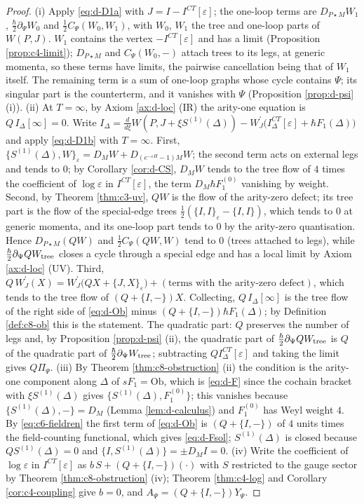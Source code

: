 \begin{proof}
(i) Apply \eqref{eq:d-D1a} with $J=I-I^{CT}[\varepsilon]$; the one-loop terms are $D_{P\star M}W_1$, $\tfrac\hbar2\partial_\Psi W_0$ and $\tfrac12C_\Psi(W_0,W_1)$, with $W_0$, $W_1$ the tree and one-loop parts of $W(P,J)$. $W_1$ contains the vertex $-I^{CT}[\varepsilon]$ and has a limit (Proposition \ref{prop:c4-limit}); $D_{P\star M}$ and $C_\Psi(W_0,-)$ attach trees to its legs, at generic momenta, so these terms have limits, the pairwise cancellation being that of $W_1$ itself. The remaining term is a sum of one-loop graphs whose cycle contains $\Psi$; its singular part is the counterterm, and it vanishes with $\Psi$ (Proposition \ref{prop:d-psi} (i)). (ii) At $T=\infty$, by Axiom \ref{ax:d-loc} (IR) the arity-one equation is $Q\,I_\Delta[\infty]=0$. Write $I_\Delta=\frac{d}{d\xi}W(P,J+\xi S^{(1)}(\Delta))-W^{\prime}_J\big(I^{CT}_\Delta[\varepsilon]+\hbar F_1(\Delta)\big)$ and apply \eqref{eq:d-D1b} with $T=\infty$. First, $\{S^{(1)}(\Delta),W\}_\varepsilon=D_MW+D_{(e^{-\varepsilon H}-1)M}W$; the second term acts on external legs and tends to $0$; by Corollary \ref{cor:d-CS}, $D_MW$ tends to the tree flow of $4$ times the coefficient of $\log\varepsilon$ in $I^{CT}[\varepsilon]$, the term $D_M\hbar F_1^{(0)}$ vanishing by weight. Second, by Theorem \ref{thm:c3-uv}, $QW$ is the flow of the arity-zero defect; its tree part is the flow of the special-edge trees $\tfrac12(\{I,I\}_\varepsilon-\{I,I\})$, which tends to $0$ at generic momenta, and its one-loop part tends to $0$ by the arity-zero quantisation. Hence $D_{P\star M}(QW)$ and $\tfrac12C_\Psi(QW,W)$ tend to $0$ (trees attached to legs), while $\tfrac\hbar2\partial_\Psi QW_{\rm tree}$ closes a cycle through a special edge and has a local limit by Axiom \ref{ax:d-loc} (UV). Third, $Q\,W^{\prime}_J(X)=W^{\prime}_J\big(QX+\{J,X\}_\varepsilon\big)+(\text{terms with the arity-zero defect})$, which tends to the tree flow of $(Q+\{I,-\})X$. Collecting, $Q\,I_\Delta[\infty]$ is the tree flow of the right side of \eqref{eq:d-Ob} minus $(Q+\{I,-\})\hbar F_1(\Delta)$; by Definition \ref{def:c8-ob} this is the statement. The quadratic part: $Q$ preserves the number of legs and, by Proposition \ref{prop:d-psi} (ii), the quadratic part of $\tfrac\hbar2\partial_\Psi QW_{\rm tree}$ is $Q$ of the quadratic part of $\tfrac\hbar2\partial_\Psi W_{\rm tree}$; subtracting $QI^{CT}_\Delta[\varepsilon]$ and taking the limit gives $Q\Pi_\Psi$. (iii) By Theorem \ref{thm:c8-obstruction} (ii) the condition is the arity-one component along $\Delta$ of $sF_1=\mathrm{Ob}$, which is \eqref{eq:d-F} since the cochain bracket with $\xi S^{(1)}(\Delta)$ gives $\{S^{(1)}(\Delta),F_1^{(0)}\}$; this vanishes because $\{S^{(1)}(\Delta),-\}=D_M$ (Lemma \ref{lem:d-calculus}) and $F_1^{(0)}$ has Weyl weight $4$. By \eqref{eq:c6-fieldren} the first term of \eqref{eq:d-Ob} is $(Q+\{I,-\})$ of $4$ units times the field-counting functional, which gives \eqref{eq:d-Fsol}; $S^{(1)}(\Delta)$ is closed because $QS^{(1)}(\Delta)=0$ and $\{I,S^{(1)}(\Delta)\}=\pm D_MI=0$. (iv) Write the coefficient of $\log\varepsilon$ in $I^{CT}[\varepsilon]$ as $b\,S+(Q+\{I,-\})(\cdot)$ with $S$ restricted to the gauge sector by Theorem \ref{thm:c8-obstruction} (iv); Theorem \ref{thm:c4-log} and Corollary \ref{cor:c4-coupling} give $b=0$, and $A_\Psi=(Q+\{I,-\})Y_\Psi$.

\end{proof}

